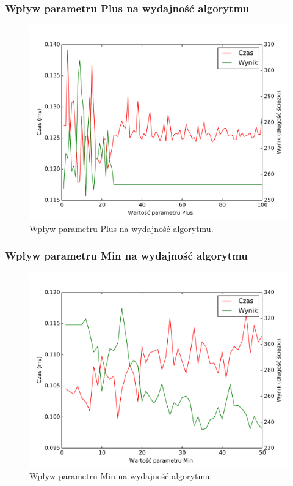 \documentclass[11pt,a4paper]{article}
\begin{document}
\subsubsection{Wpływ parametru Plus na wydajność algorytmu}
\begin{figure}[H]
\includegraphics[trim = 0mm 3mm 0mm 12mm, clip, width=14cm]{graphs/plus.pdf}
\caption{Wpływ parametru Plus na wydajność algorytmu.}
\end{figure}

\subsubsection{Wpływ parametru Min na wydajność algorytmu}
\begin{figure}[H]
\includegraphics[trim = 0mm 3mm 0mm 12mm, clip, width=14cm]{graphs/min.pdf}
\caption{Wpływ parametru Min na wydajność algorytmu.}
\end{figure}
\end{document}
